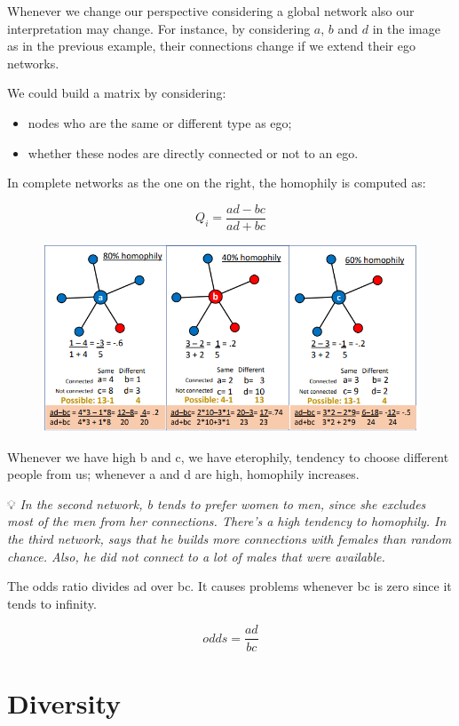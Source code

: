 \documentclass[
  notitlepage,
  onecolumn,
  openany]{book}
\providecommand{\tightlist}{%
  \setlength{\itemsep}{0pt}\setlength{\parskip}{0pt}}
\begin{document}
Whenever we change our perspective considering a global network also our interpretation may change. For instance, by considering \(a\), \(b\) and \(d\) in the image as in the previous example, their connections change if we extend their ego networks.

We could build a matrix by considering:

\begin{itemize}
\tightlist
\item
  nodes who are the same or different type as ego;
\item
  whether these nodes are directly connected or not to an ego.
\end{itemize}

In complete networks as the one on the right, the homophily is computed as:

\[
Q_i = \frac{ad-bc}{ad+bc}
\]

\begin{figure}[h!]

{\centering \includegraphics[width=0.8\linewidth]{images/06-Attributes based measures/Untitled 4} 

}

\end{figure}

Whenever we have high b and c, we have eterophily, tendency to choose different people from us; whenever a and d are high, homophily increases.

💡 \emph{In the second network, b tends to prefer women to men, since she excludes most of the men from her connections. There's a high tendency to homophily.
In the third network, says that he builds more connections with females than random chance. Also, he did not connect to a lot of males that were available.}

The odds ratio divides ad over bc. It causes problems whenever bc is zero since it tends to infinity.

\[
odds = \frac{ad}{bc}
\]

\hypertarget{diversity}{%
\section{Diversity}\label{diversity}}
\end{document}
